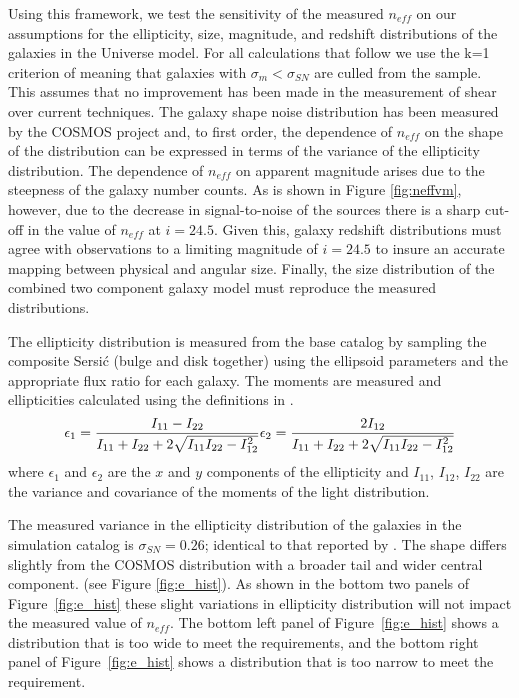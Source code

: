 \documentclass[]{article}
\begin{document}
Using this framework, we test the sensitivity of the measured
$n_{eff}$ on our assumptions for the ellipticity, size, magnitude, and
redshift distributions of the galaxies in the Universe model.  For all
calculations that follow we use the k=1 criterion of \citet{chang}
meaning that galaxies with $\sigma_m < \sigma_{SN}$ are culled from
the sample. This assumes that no improvement has been made in the
measurement of shear over current techniques.  The galaxy shape noise
distribution has been measured by the COSMOS project \citep{cosmos}
and, to first order, the dependence of $n_{eff}$ on the shape of the
distribution can be expressed in terms of the variance of the
ellipticity distribution. The dependence of $n_{eff}$ on apparent
magnitude arises due to the steepness of the galaxy number counts. As
is shown in Figure \ref{fig:neffvm}, however, due to the decrease in
signal-to-noise of the sources there is a sharp cut-off in the value
of $n_{eff}$ at $i=24.5$.  Given this, galaxy redshift distributions
must agree with observations to a limiting magnitude of $i=24.5$ to
insure an accurate mapping between physical and angular size.
Finally, the size distribution of the combined two component galaxy
model must reproduce the measured distributions.

The ellipticity distribution is measured from the base catalog by
sampling the composite Sersi{\'c} (bulge and disk together) using the
ellipsoid parameters and the appropriate flux ratio for each galaxy.
The moments are measured and ellipticities calculated using the
definitions in \citet{chang}.
\begin{equation}
\epsilon_1 = \frac{I_{11}-I_{22}}{I_{11}+I_{22}+2\sqrt{I_{11}I_{22} - I^{2}_{12}}}\\
\epsilon_2 = \frac{2I_{12}}{I_{11}+I_{22}+2\sqrt{I_{11}I_{22} - I^{2}_{12}}}
\end{equation}
where $\epsilon_1$ and $\epsilon_2$ are the $x$ and $y$ components of
the ellipticity and $I_{11}$, $I_{12}$, $I_{22}$ are the variance and
covariance of the moments of the light distribution.

The measured variance in the ellipticity distribution of the galaxies
in the simulation catalog is $\sigma_{SN} = 0.26$; identical to that
reported by \citet{chang}. The shape differs slightly from the COSMOS
distribution with a broader tail and wider central component. (see
Figure \ref{fig:e_hist}).  As shown in
the bottom two panels of Figure~\ref{fig:e_hist} these
slight variations in ellipticity distribution will not impact the
measured value of $n_{eff}$.  The bottom left panel of Figure~\ref{fig:e_hist}
shows a distribution that is too wide to meet the requirements, and the bottom
right panel of Figure~\ref{fig:e_hist} shows a distribution that is 
too narrow to meet the requirement.
\end{document}
